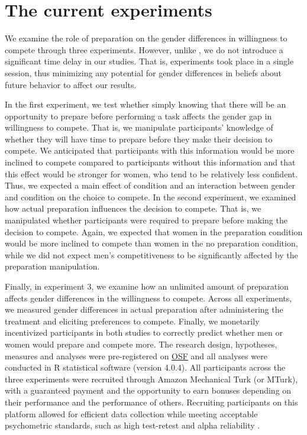 \documentclass[a4paper, nobind]{templates/ociamthesis}
\begin{document}
\hypertarget{the-current-experiments}{%
\section{The current experiments}\label{the-current-experiments}}

We examine the role of preparation on the gender differences in willingness to compete through three experiments. However, unlike \textcite{Charness2021}, we do not introduce a significant time delay in our studies. That is, experiments took place in a single session, thus minimizing any potential for gender differences in beliefs about future behavior to affect our results.

In the first experiment, we test whether simply knowing that there will be an opportunity to prepare before performing a task affects the gender gap in willingness to compete. That is, we manipulate participants' knowledge of whether they will have time to prepare before they make their decision to compete. We anticipated that participants with this information would be more inclined to compete compared to participants without this information and that this effect would be stronger for women, who tend to be relatively less confident. Thus, we expected a main effect of condition and an interaction between gender and condition on the choice to compete. In the second experiment, we examined how actual preparation influences the decision to compete. That is, we manipulated whether participants were required to prepare before making the decision to compete. Again, we expected that women in the preparation condition would be more inclined to compete than women in the no preparation condition, while we did not expect men's competitiveness to be significantly affected by the preparation manipulation.

Finally, in experiment 3, we examine how an unlimited amount of preparation affects gender differences in the willingness to compete. Across all experiments, we measured gender differences in actual preparation after administering the treatment and eliciting preferences to compete. Finally, we monetarily incentivized participants in both studies to correctly predict whether men or women would prepare and compete more. The research design, hypotheses, measures and analyses were pre-registered on \href{https://osf.io/q39a5/}{OSF} and all analyses were conducted in R statistical software (version 4.0.4). All participants across the three experiments were recruited through Amazon Mechanical Turk (or MTurk), with a guaranteed payment and the opportunity to earn bonuses depending on their performance and the performance of others. Recruiting participants on this platform allowed for efficient data collection while meeting acceptable psychometric standards, such as high test-retest and alpha reliability \autocite{Rand2012,Buhrmester2011}.
\end{document}
